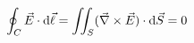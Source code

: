 \documentclass[preview]{standalone}
\begin{document}
\begin{align*}
\special{dvisvgm:raw <g id='unique000'>}\oint_C\vec E\cdot\mathrm d\vec\ell=\iint_S(\vec\nabla\times\vec E)\cdot\mathrm d\vec S=0\special{dvisvgm:raw </g>}
\end{align*}
\end{document}
